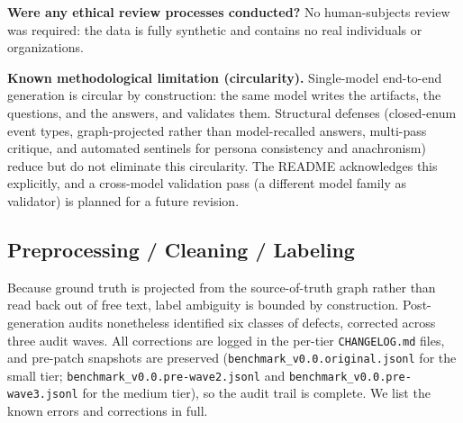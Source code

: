 \textbf{Were any ethical review processes conducted?}
No human-subjects review was required: the data is fully synthetic and contains
no real individuals or organizations.

\textbf{Known methodological limitation (circularity).}
Single-model end-to-end generation is circular by construction: the same model
writes the artifacts, the questions, and the answers, and validates them.
Structural defenses (closed-enum event types, graph-projected rather than
model-recalled answers, multi-pass critique, and automated sentinels for persona
consistency and anachronism) reduce but do not eliminate this circularity. The
README acknowledges this explicitly, and a cross-model validation pass (a
different model family as validator) is planned for a future revision.

\subsection{Preprocessing / Cleaning / Labeling}

Because ground truth is projected from the source-of-truth graph rather than read
back out of free text, label ambiguity is bounded by construction. Post-generation
audits nonetheless identified six classes of defects, corrected across three audit
waves. All corrections are logged in the per-tier \texttt{CHANGELOG.md} files, and
pre-patch snapshots are preserved (\texttt{benchmark\_v0.0.original.jsonl} for the
small tier; \texttt{benchmark\_v0.0.pre-wave2.jsonl} and
\texttt{benchmark\_v0.0.pre-wave3.jsonl} for the medium tier), so the audit trail
is complete. We list the known errors and corrections in full.

